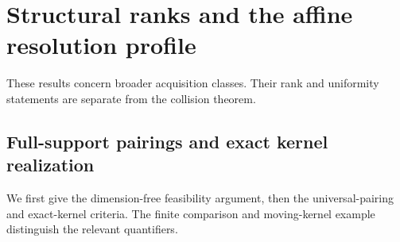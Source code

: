 \section{Structural ranks and the affine resolution profile}
\label{app:structural}
These results concern broader acquisition classes. Their rank and
uniformity statements are separate from the collision theorem.
\begingroup
\let\section\subsection
\let\subsection\subsubsection
\let\subsubsection\paragraph


\endgroup
\section{Full-support pairings and exact kernel realization}
\label{app:pairings}
We first give the dimension-free feasibility argument, then the
universal-pairing and exact-kernel criteria. The finite comparison and
moving-kernel example distinguish the relevant quantifiers.
\begingroup
\let\section\subsection
\let\subsection\subsubsection
\let\subsubsection\paragraph







\endgroup
